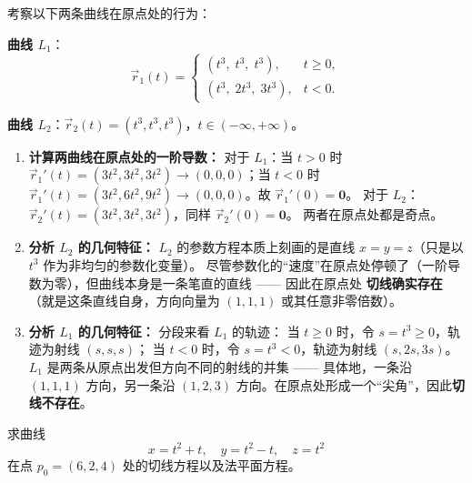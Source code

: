 \documentclass[lang=cn,11pt]{elegantbook}
\begin{document}
\begin{example}[奇点处切线行为] \label{ex:singular-points}
考察以下两条曲线在原点处的行为：

\textbf{曲线 $L_1$}：
\[
\vec{r}_1(t)=
\begin{cases}
(t^3,\;t^3,\;t^3),      & t\geq 0,\\
(t^3,\;2t^3,\;3t^3),    & t<0.
\end{cases}
\]

\textbf{曲线 $L_2$}：$\vec{r}_2(t)=(t^3,t^3,t^3)$，$t\in(-\infty,+\infty)$。
\end{example}

\begin{solution}
\begin{enumerate}
  \item \textbf{计算两曲线在原点处的一阶导数：}
  对于 $L_1$：当 $t>0$ 时 $\vec{r}_1'(t)=(3t^2,3t^2,3t^2)\to(0,0,0)$；当 $t<0$ 时 $\vec{r}_1'(t)=(3t^2,6t^2,9t^2)\to(0,0,0)$。故 $\vec{r}_1'(0)=\boldsymbol{0}$。
  对于 $L_2$：$\vec{r}_2'(t)=(3t^2,3t^2,3t^2)$，同样 $\vec{r}_2'(0)=\boldsymbol{0}$。
  两者在原点处都是奇点。

  \item \textbf{分析 $L_2$ 的几何特征：}
  $L_2$ 的参数方程本质上刻画的是直线 $x=y=z$（只是以 $t^3$ 作为非均匀的参数化变量）。
  尽管参数化的“速度”在原点处停顿了（一阶导数为零），但曲线本身是一条笔直的直线 —— 因此在原点处 \textbf{切线确实存在}（就是这条直线自身，方向向量为 $(1,1,1)$ 或其任意非零倍数）。

  \item \textbf{分析 $L_1$ 的几何特征：}
  分段来看 $L_1$ 的轨迹：
  当 $t\geq 0$ 时，令 $s=t^3\geq 0$，轨迹为射线 $(s,s,s)$；
  当 $t<0$ 时，令 $s=t^3<0$，轨迹为射线 $(s,2s,3s)$。
  $L_1$ 是两条从原点出发但方向不同的射线的并集 —— 具体地，一条沿 $(1,1,1)$ 方向，另一条沿 $(1,2,3)$ 方向。在原点处形成一个“尖角”，因此\textbf{切线不存在}。
\end{enumerate}
\end{solution}

\begin{example}[参数曲线的基本计算] \label{ex:param-basic}
求曲线
\[
x=t^2+t,\quad y=t^2-t,\quad z=t^2
\]
在点 $p_0=(6,2,4)$ 处的切线方程以及法平面方程。
\end{example}
\end{document}
